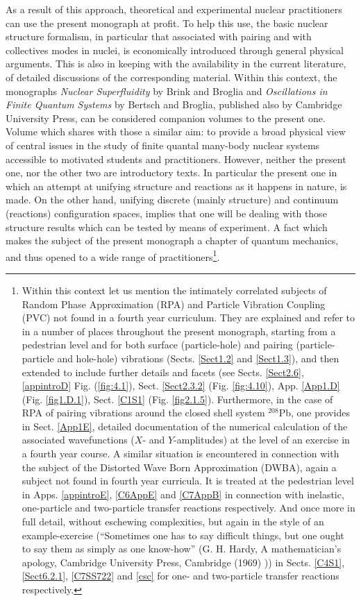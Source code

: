 As a result of this approach, theoretical and experimental nuclear practitioners can use the present monograph at profit. To help this use, the basic nuclear structure formalism, in particular that associated with pairing and with collectives modes in nuclei, is economically introduced through general physical arguments. This is also in keeping with the availability in the current literature, of detailed discussions of the corresponding material. Within this context, the monographs \emph{Nuclear Superfluidity} by Brink and Broglia and \emph{Oscillations in Finite Quantum Systems}  by Bertsch and Broglia, published also by Cambridge University Press, can be considered companion volumes to the present one. Volume which shares with those a similar aim: to provide a broad physical view of central issues in the study of finite quantal many-body nuclear systems accessible to motivated students and practitioners. However, neither the present one, nor the other two are introductory texts. In particular the present one in which an attempt at unifying structure and reactions as it happens in nature, is made. On the other hand, unifying discrete (mainly structure) and continuum (reactions) configuration spaces, implies that one will be dealing with those structure results which can be tested by means of experiment. A fact which makes the subject of the present monograph a chapter of quantum mechanics, and thus opened to a wide range of practitioners\footnote{Within this context let us mention the intimately correlated subjects of Random Phase Approximation (RPA) and Particle Vibration Coupling (PVC) not found in a fourth year curriculum. They are explained and refer to in a number of places throughout the present monograph, starting from a pedestrian level and for both surface (particle-hole) and pairing (particle-particle and hole-hole) vibrations (Sects. \ref{Sect1.2} and \ref{Sect1.3}), and then extended to include further details and facets (see Sects. \ref{Sect2.6}, \ref{appintroD} Fig. (\ref{fig:4.1}), Sect. \ref{Sect2.3.2} (Fig. \ref{fig:4.10}), App. \ref{App1.D} (Fig. \ref{fig1.D.1}), Sect. \ref{C1S1} (Fig. \ref{fig2.1.5}). Furthermore, in the case of RPA of pairing vibrations around the closed shell system $^{208}$Pb, one provides in Sect. \ref{App1E}, detailed documentation of the numerical calculation of the associated wavefunctions ($X$- and $Y$-amplitudes) at the level of an exercise in a fourth year course. A similar situation is encountered in connection with the subject of the Distorted Wave Born Approximation (DWBA), again a subject not found in fourth year curricula. It is treated at the pedestrian level in Apps. \ref{appintroE}, \ref{C6AppE} and \ref{C7AppB} in connection with inelastic, one-particle and two-particle transfer reactions respectively. And once more in full detail, without eschewing complexities, but again in the style of an example-exercise (``Sometimes one has to say difficult things, but one ought to say them as simply as one know-how'' (G. H. Hardy, A mathematician's apology, Cambridge University Press, Cambridge (1969) )) in Sects. \ref{C4S1}, \ref{Sect6.2.1}, \ref{C7SS722} and \ref{csc} for one- and two-particle transfer reactions respectively.}.

